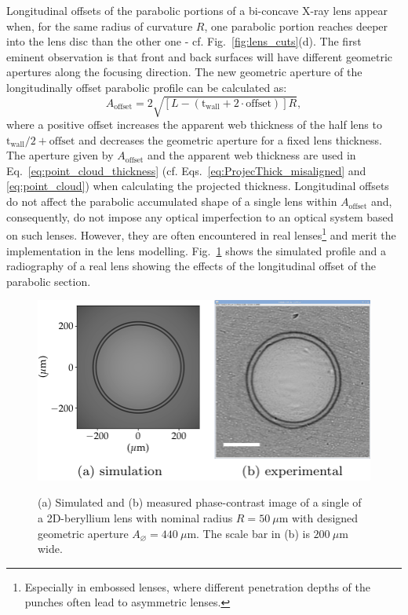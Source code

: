 \begin{refsection}
Longitudinal offsets of the parabolic portions of a bi-concave X-ray lens appear when, for the same radius of curvature $R$, one parabolic portion reaches deeper into the lens disc than the other one - cf. Fig.~\ref{fig:lens_cuts}(d). The first eminent observation is that front and back surfaces will have different geometric apertures along the focusing direction. The new geometric aperture of the longitudinally offset parabolic profile can be calculated as:
\begin{equation}\label{eq:A_2}
    A_{\text{offset}} = 2\sqrt{[L-(\text{t}_\text{wall}+2\cdot\text{offset})]R},
\end{equation}{}
where a positive offset increases the apparent web thickness of the half lens to $\text{t}_\text{wall}/2+\text{offset}$ and decreases the geometric aperture for a fixed lens thickness. The aperture given by $A_{\text{offset}}$ and the apparent web thickness are used in Eq.~\ref{eq:point_cloud_thickness} (cf. Eqs.~\ref{eq:ProjecThick_misaligned} and \ref{eq:point_cloud}) when calculating the projected thickness.
Longitudinal offsets do not affect the parabolic accumulated shape of a single lens within $A_{\text{offset}}$ and, consequently, do not impose any optical imperfection to an optical system based on such lenses. However, they are often encountered in real lenses\footnote{Especially in embossed lenses, where different penetration depths of the punches often lead to asymmetric lenses.} and merit the implementation in the lens modelling. Fig.~\ref{fig:longitudinal_offset} shows the simulated profile and a radiography of a real lens showing the effects of the longitudinal offset of the parabolic section.

\begin{figure}[t]
        \centering
        {\includegraphics[height=3.cm]{figures/compressed/longitudinal_offset.pdf}}
        \caption[Effects of the longitudinal offset of the parabolic section]{(a) Simulated and (b) measured phase-contrast image of a single of a 2D-beryllium lens with nominal radius $R=50~\mu\text{m}$ with designed geometric aperture $A_{\diameter}=440~\mu\text{m}$. The scale bar in (b) is $200~\mu$m wide.} \label{fig:longitudinal_offset}
\end{figure}


\end{refsection}
